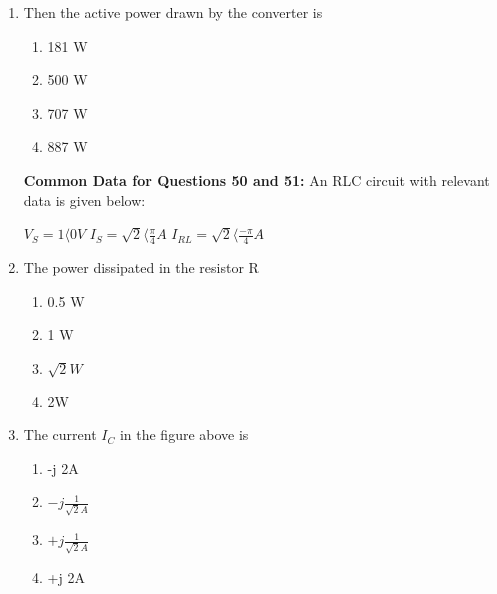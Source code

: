\documentclass[journal]{IEEEtran}
\begin{document}
\begin{enumerate}
 
    \item Then the active power drawn by the converter is
    \begin{multicols}{4}
            \begin{enumerate}
              \item 181 W
              \item  500 W
              \item  707 W
              \item 887 W
            \end{enumerate}
        \end{multicols}
        \textbf{Common Data for Questions 50 and 51:}
        An RLC circuit with relevant data is given below:
        
        $V_S=1\langle 0 V$
        $I_S=\sqrt{2}\langle \frac{\pi}{4}A$
        $I_{RL}=\sqrt{2}\langle \frac{-\pi}{4}A$
    
     
    \item The power dissipated in the resistor R
    \begin{multicols}{4}
            \begin{enumerate}
              \item  0.5 W
              \item 1 W
              \item $\sqrt{2} W$
              \item 2W 
            \end{enumerate}
        \end{multicols}
    
    

    \item  The current $I_C$ in the figure above is
   \begin{multicols}{4}
            \begin{enumerate}
            \item -j 2A
            \item $-j \frac{1}{\sqrt{2}A}$
            \item  $+j \frac{1}{\sqrt{2}A}$
            \item +j 2A
            \end{enumerate}
             \end{multicols}
       
    
        
 
 \end{enumerate}
\end{document}
